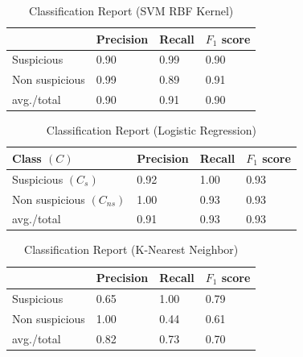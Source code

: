 \begin{table}[h!]
\begin{center}
\caption{Classification Report (SVM RBF Kernel)}
\begin{tabular}{|m{2.8cm} | m{1.5cm}| m{1.3cm}| m{1.5cm}|}
\hline
     & Precision & Recall & $F_1$ score\\
\hline
     Suspicious & 0.90 & 0.99 & 0.90\\
\hline 
     Non suspicious  & 0.99 & 0.89 & 0.91\\
\hline 
     avg./total & 0.90 & 0.91 & 0.90\\
\hline
\end{tabular}
\label{SVMR}
\end{center}
\end{table}
\fi
\renewcommand{\arraystretch}{1.6}
\begin{table}[h!]
\begin{center}
\caption{Classification Report (Logistic Regression)}
\begin{tabular}{||m{3.1cm} | m{1.4cm}| m{1.2cm}| m{1.4cm}||}
\hline
     Class $(C)$& Precision & Recall & $F_1$ score\\
\hline
\hline
     Suspicious $(C_s)$ & 0.92 & 1.00 & 0.93\\
\hline 
     Non suspicious $(C_{ns})$  & 1.00 & 0.93 & 0.93\\
\hline 
     avg./total & 0.91 & 0.93 & 0.93\\
\hline
\end{tabular}
\label{lr}
\end{center}
\end{table}

\iffalse
\begin{table}[h!]
\begin{center}
\caption{Classification Report (K-Nearest Neighbor)}
\begin{tabular}{|m{2.8cm} | m{1.5cm}| m{1.3cm}| m{1.5cm}|}
\hline
     & Precision & Recall & $F_1$ score\\
\hline
     Suspicious & 0.65 & 1.00 & 0.79\\
\hline 
     Non suspicious  & 1.00 & 0.44 & 0.61\\
\hline 
     avg./total & 0.82 & 0.73 & 0.70\\
\hline
\end{tabular}
\label{tknn}
\end{center}
\end{table}

